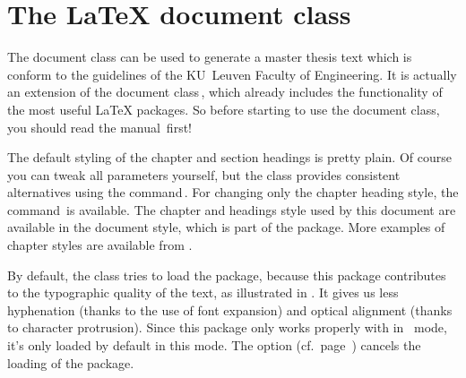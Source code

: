 \newcommand*\optionlabel[1]{\hspace\labelsep
  \let\oldmeta\meta \renewcommand*\meta[1]{{\rmfamily \oldmeta{##1}}}%
  \renewcommand*\and{\unskip\textrm{'' or ``}}%
  \normalfont \textsc{Option%
    \csname kulemt@ifand\endcsname{#1}s} ``\opt{#1}''}
\newcommand*\optionlabelnote[1]{\hfill \textit{(#1)}}
\newcommand*\betweenarrows[1]{%
  $\leftarrow\mkern-7mu\cleaders\hbox{$\mkern-2mu\relbar\mkern-2mu$}\hfill
   \enspace\hbox{#1}\enspace
   \cleaders\hbox{$\mkern-2mu\relbar\mkern-2mu$}\hfill\mkern-7mu\rightarrow$}

\chapter{The LaTeX document class }
\label{cha:kulemt}
The document class  can be used to generate a master thesis
text which is conform to the guidelines of the KU~Leuven Faculty of
Engineering. It is actually an extension of the  document
class\,\cite{pkg:memoir}, which already includes the functionality of the
most useful LaTeX packages. So before starting to use the 
document class, you should read the  manual\,\cite{memman} first!

The default styling of the chapter and section headings is pretty plain. Of
course you can tweak all parameters yourself, but the  class
provides consistent alternatives using the 
command\,\cite[\S6.9]{memman}. For changing only the chapter heading style,
the  command\,\cite[\S6.5]{memman} is available. The
chapter and headings style used by this document are available in the
 document style, which is part of the  package.
More examples of chapter styles are available from \cite{memchap}.

By default, the  class tries to load the 
package, because this package contributes to the typographic quality of the
text, as illustrated in . It gives us less hyphenation
(thanks to the use of font expansion) and optical alignment (thanks to
character protrusion). Since this package only works properly with
 in \PDF\ mode, it's only loaded by default in this mode.
The option  (cf.\ page~\pageref{opt:nomicrotype}) cancels
the loading of the package.


